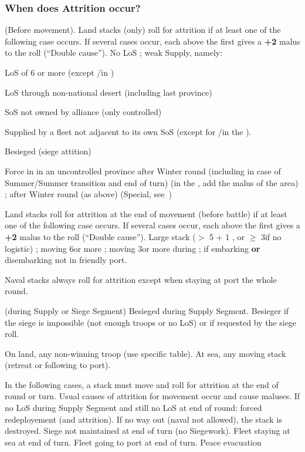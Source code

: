 \subsubsection{When does Attrition occur?}
 (Before movement). Land stacks (only) roll for
attrition if at least one of the following case occurs. If several cases
occur, each above the first gives a \textbf{+2} malus to the roll (``Double
cause'').
\bparag No LoS ;
\bparag weak Supply, namely:
\begin{modlist}
\item LoS of 6 or more \MP (except \LD/\LDE in \ROTW)
\item LoS through non-national desert (including last province)
\item SoS not owned by alliance (only controlled)
\item Supplied by a fleet not adjacent to its own SoS (except for
  \LD/\LDE in the \ROTW).
\item Besieged (siege attition)
\end{modlist}
\bparag Force in  in an uncontrolled province after Winter
round (including in case of Summer/Summer transition and end of turn) (in the
\ROTW, add the malus of the area) ;
\bparag \Timar after Winter round (as above) (Special,
see~)

 Land stacks roll for attrition at the end of
movement (before battle) if at least one of the following case occurs. If
several cases occur, each above the first gives a \textbf{+2} malus to the
roll (``Double cause'').
\bparag Large stack ($>$ 5 \LD + 1 \Pasha, or $\geq$ 3\LD if no logistic) ;
\bparag moving 6\MP or more ;
\bparag moving 3\MP or more during  ;
\bparag if embarking \textbf{or} disembarking not in friendly port.

 Naval stacks always roll for attrition except when
staying at port the whole round.

 (during Supply or Siege Segment)
\bparag Besieged during Supply Segment.
\bparag Besieger if the siege is impossible (not enough troops or no LoS) or
if requested by the siege roll.

\bparag On land, any non-winning troop (use specific table).
\bparag At sea, any moving stack (retreat or following to port).

 In the following cases, a stack
must move and roll for attrition at the end of round or turn. Usual causes of
attrition for movement occur and cause maluses.
\bparag If no LoS during Supply Segment and still no LoS at end of round:
forced redeployement (and attrition). If no way out (naval not allowed), the
stack is destroyed.
\bparag Siege not maintained at end of turn (no Siegework\faceplus).
\bparag Fleet staying at sea at end of turn.
\bparag Fleet going to port at end of turn.
\bparag Peace evacuation

